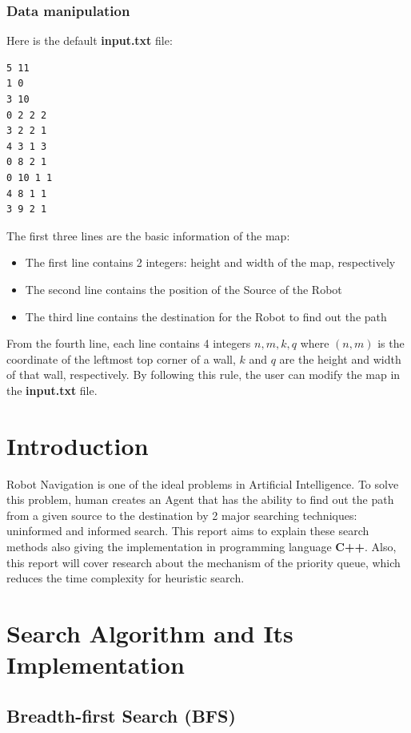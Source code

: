 \documentclass{assignment}
\begin{document}
\subsubsection{Data manipulation}

Here is the default \textbf{input.txt} file:
\begin{lstlisting}[caption={input.txt}]
5 11
1 0
3 10
0 2 2 2
3 2 2 1
4 3 1 3
0 8 2 1
0 10 1 1
4 8 1 1
3 9 2 1   
\end{lstlisting}

The first three lines are the basic information of the map:
\begin{itemize}
    \item The first line contains 2 integers: height and width of the map, respectively
    \item The second line contains the position of the Source of the Robot
    \item The third line contains the destination for the Robot to find out the path 
\end{itemize}

From the fourth line, each line contains 4 integers $n, m, k, q$ where $(n, m)$ is the coordinate of the leftmost top corner of a wall, $k$ and $q$ are the height and width of that wall, respectively. By following this rule, the user can modify the map in the \textbf{input.txt} file.




\section{Introduction}

Robot Navigation is one of the ideal problems in Artificial Intelligence. To solve this problem, human creates an Agent that has the ability to find out the path from a given source to the destination by 2 major searching techniques: uninformed and informed search. This report aims to explain these search methods also giving the implementation in programming language \textbf{C++}. Also, this report will cover research about the mechanism of the priority queue, which reduces the time complexity for heuristic search. 

\section{Search Algorithm and Its Implementation}
\subsection{Breadth-first Search (BFS)}
\end{document}
